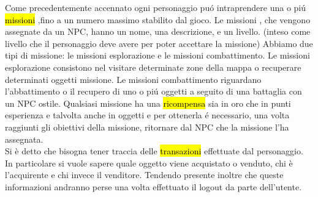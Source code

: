 Come precedentemente accennato ogni personaggio pu\'{o} intraprendere una o pi\'{u} \hl{missioni} ,fino a un numero massimo stabilito dal gioco.
Le missioni , che vengono assegnate da un NPC, hanno un nome, una descrizione, e un livello. (inteso come livello che il personaggio deve avere per poter accettare la missione)
Abbiamo due tipi di missione: le missioni esplorazione e  le missioni combattimento. Le missioni esplorazione  consistono nel visitare determinate zone della mappa o recuperare determinati oggetti missione. Le missioni  combattimento riguardano l'abbattimento o il recupero di uno o pi\'{u} oggetti a seguito di una battaglia con un NPC ostile.
Qualsiasi  missione ha una \hl{ricompensa} sia in oro che in punti esperienza e talvolta anche in oggetti e per ottenerla \'{e} necessario, una volta raggiunti gli obiettivi della missione, ritornare dal NPC che la missione l'ha assegnata.\\

Si è detto che bisogna tener traccia delle \hl{transazioni} effettuate  dal personaggio. In particolare si vuole sapere quale oggetto viene acquistato o venduto, chi è l'acquirente e chi invece il venditore.
Tendendo presente inoltre che queste informazioni andranno perse una volta effettuato il logout da parte dell'utente.

\newpage 